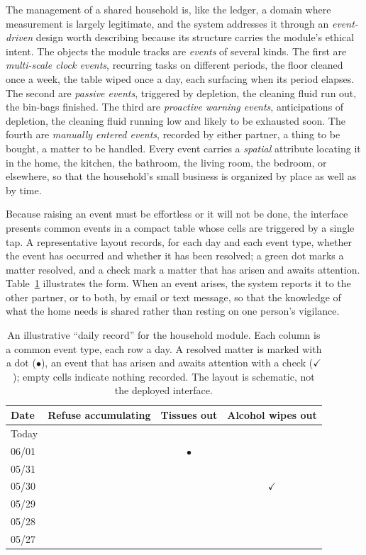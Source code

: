 \documentclass[11pt,a4paper]{article}
\begin{document}
The management of a shared household is, like the ledger, a domain where measurement is largely legitimate, and the system addresses it through an \emph{event-driven} design worth describing because its structure carries the module's ethical intent. The objects the module tracks are \emph{events} of several kinds. The first are \emph{multi-scale clock events}, recurring tasks on different periods, the floor cleaned once a week, the table wiped once a day, each surfacing when its period elapses. The second are \emph{passive events}, triggered by depletion, the cleaning fluid run out, the bin-bags finished. The third are \emph{proactive warning events}, anticipations of depletion, the cleaning fluid running low and likely to be exhausted soon. The fourth are \emph{manually entered events}, recorded by either partner, a thing to be bought, a matter to be handled. Every event carries a \emph{spatial} attribute locating it in the home, the kitchen, the bathroom, the living room, the bedroom, or elsewhere, so that the household's small business is organized by place as well as by time.

Because raising an event must be effortless or it will not be done, the interface presents common events in a compact table whose cells are triggered by a single tap. A representative layout records, for each day and each event type, whether the event has occurred and whether it has been resolved; a green dot marks a matter resolved, and a check mark a matter that has arisen and awaits attention. Table~\ref{p01:tab:household} illustrates the form. When an event arises, the system reports it to the other partner, or to both, by email or text message, so that the knowledge of what the home needs is shared rather than resting on one person's vigilance.

\begin{small}
\renewcommand{\arraystretch}{1.25}
\begin{table}[h]
\centering
\caption{An illustrative ``daily record'' for the household module. Each column is a common event type, each row a day. A resolved matter is marked with a dot ($\bullet$), an event that has arisen and awaits attention with a check ($\checkmark$); empty cells indicate nothing recorded. The layout is schematic, not the deployed interface.}\label{p01:tab:household}
\begin{tabular}{@{}l c c c@{}}
\toprule
\textbf{Date} & \textbf{Refuse accumulating} & \textbf{Tissues out} & \textbf{Alcohol wipes out}\\
\midrule
Today  &  &  & \\
06/01  &  & $\bullet$ & \\
05/31  &  &  & \\
05/30  &  &  & $\checkmark$\\
05/29  &  &  & \\
05/28  &  &  & \\
05/27  &  &  & \\
\bottomrule
\end{tabular}
\end{table}
\end{small}
\end{document}
